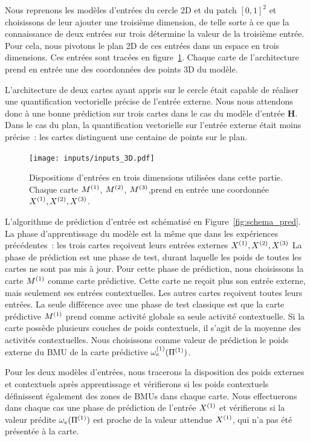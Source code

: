 \documentclass[../main]{subfiles}
\begin{document}
Nous reprenons les modèles d'entrées du cercle 2D et du patch $[0,1]^2$ et choisissons de leur ajouter une troisième dimension, de telle sorte à ce que la connaissance de deux entrées sur trois détermine la valeur de la troisième entrée. Pour cela, nous pivotons le plan 2D de ces entrées dans un espace en trois dimensions.
Ces entrées sont tracées en figure~\ref{fig:inputs_3D}.
Chaque carte de l'architecture prend en entrée une des coordonnées des points 3D du modèle.

L'architecture de deux cartes ayant appris sur le cercle était capable de réaliser une quantification vectorielle précise de l'entrée externe. Nous nous attendons donc à une bonne prédiction sur trois cartes dans le cas du modèle d'entrée \textbf{H}. Dans le cas du plan, la quantification vectorielle sur l'entrée externe était moins précise~: les cartes distinguent une centaine de points sur le plan. 

\begin{figure}[h!]
	\texttt{[image: inputs/inputs\_3D.pdf]}
	\caption{Dispositions d'entrées en trois dimensions utilisées dans cette partie. Chaque carte $M^{({1})}$, $M^{({2})}$, $M^{({3})}$,prend en entrée une coordonnée $X^{({1})}, X^{({2})}, X^{({3})}$. \label{fig:inputs_3D}}
\end{figure}

L'algorithme de prédiction d'entrée est schématisé en Figure~\ref{fig:schema_pred}.
La phase d'apprentissage du modèle est la même que dans les expériences précédentes~: les trois cartes reçoivent leurs entrées externes $X^{({1})},X^{({2})}, X^{({3})} $
La phase de prédiction est une phase de test, durant laquelle les poids de toutes les cartes ne sont pas mis à jour.
Pour cette phase de prédiction, nous choisissons la carte $M^{({1})}$ comme carte prédictive. 
Cette carte ne reçoit plus son entrée externe, mais seulement ses entrées contextuelles. Les autres cartes reçoivent toutes leurs entrées.
La seule différence avec une phase de test classique est que la carte prédictive $M^{({1})}$ prend comme activité globale sa seule activité contextuelle. Si la carte possède plusieurs couches de poids contextuels, il s'agit de la moyenne des activités contextuelles.
Nous choisissons comme valeur de prédiction le poids externe du BMU de la carte prédictive $\omega_{e}^{({1})}(\Pi^{({1})})$.

Pour les deux modèles d'entrées, nous tracerons la disposition des poids externes et contextuels après apprentissage et vérifierons si les poids contextuels définissent également des zones de BMUs dans chaque carte.
Nous effectuerons dans chaque cas une phase de prédiction de l'entrée $X^{({1})}$ et vérifierons si la valeur prédite $\omega_e(\Pi^{({1})})$ est proche de la valeur attendue $X^{({1})}$, qui n'a pas été présentée à la carte.
\end{document}
